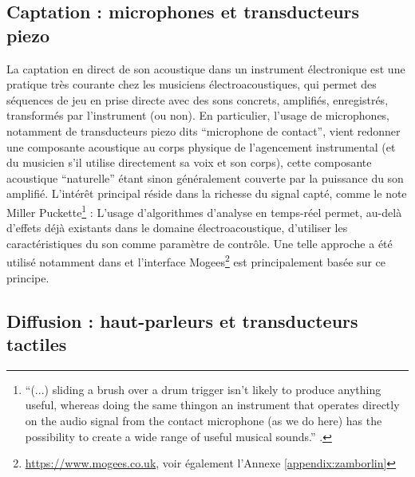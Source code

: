 
\subsection{Captation : microphones et transducteurs piezo}

\noindent La captation en direct de son acoustique dans un instrument électronique est une pratique très courante chez les musiciens électroacoustiques, qui permet des séquences de jeu en prise directe avec des sons concrets, amplifiés, enregistrés, transformés par l'instrument (ou non). En particulier, l'usage de microphones, notamment de transducteurs piezo dits ``microphone de contact'', vient redonner une composante acoustique au corps physique de l'agencement instrumental (et du musicien s'il utilise directement sa voix et son corps), cette composante acoustique ``naturelle'' étant sinon généralement couverte par la puissance du son amplifié. L'intérêt principal réside dans la richesse du signal capté, comme le note Miller Puckette\footnote{``(...) sliding a brush over a drum trigger isn’t likely to produce  anything  useful,  whereas  doing  the  same  thingon an instrument that operates directly on the audio signal from the contact microphone (as we do here) has the possibility to create a wide range of useful musical sounds.'' \cite{puckette_infuriating_2011}.} :  L'usage d'algorithmes d'analyse en temps-réel permet, au-delà d'effets déjà existants dans le domaine électroacoustique, d'utiliser les caractéristiques du son comme paramètre de contrôle. Une telle approche a été utilisé notamment dans \cite{schwarz_rich_2014} et l'interface Mogees\footnote{\url{https://www.mogees.co.uk}, voir également l'Annexe \ref{appendix:zamborlin}} est principalement basée sur ce principe. 


\subsection{Diffusion : haut-parleurs et transducteurs tactiles}

